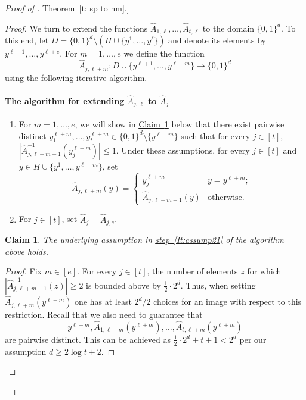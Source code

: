 \documentclass[11pt]{article}
\numberwithin{equation}{section}
\newtheorem{claim}[theorem]{Claim}
\theoremstyle{definition}
\theoremstyle{plain}
\newcommand{\expref}[2]{\hyperref[#2]{#1~\ref{#2}}}
\newcommand{\expeqref}[2]{\hyperref[#2]{#1~\eqref{#2}}}
\newcommand{\adv}{A}
\newcommand{\abs}[1]{\left\lvert #1\right\rvert}
\begin{document}
\begin{proof}[Proof of \expref{Theorem}{t: sp to nm}.]
\begin{proof}
We turn to extend the functions $\widehat{A}_{1,\ell}, \ldots, \widehat{A}_{t,\ell}$ to the domain $\{0,1\}^d$. To this end,
let $D = \{0,1\}^d \setminus (H \cup \{y^1,\ldots,y^\ell\})$ and denote its elements by $y^{\ell+1},\ldots,y^{\ell+e}$. For $m=1,\ldots,e$ we define the function \[
\widehat{\adv}_{j,\ell+m} \colon D \cup \{y^{\ell+1},\ldots, y^{\ell+m}\} \to \{0,1\}^d
\]
using the following iterative algorithm.

%
\paragraph{The algorithm for extending $\widehat{A}_{j,\ell}$ to $\widehat{A}_{j}$}
\begin{enumerate}
%
	\item\label{It:assump21} For $m = 1,\ldots, e$, we will show in \expref{Claim}{c:step 3} below that there exist pairwise distinct $y^{\ell+m}_{1},\ldots,y^{\ell+m}_{t}\in \{0,1\}^d \setminus \{y^{\ell+m}\}$ such that for every $j \in [t]$, $\abs{\widehat{A}_{j,\ell+m-1}^{-1}(y^{\ell+m}_{j})} \le 1$. Under these assumptions, for every $j \in [t]$ and $y \in H \cup \{y^{1},\ldots, y^{\ell+m}\}$, set 
	\[\widehat{A}_{j,\ell+m}(y) = \begin{cases}
	y^{\ell+m}_{j} &  y = y^{\ell+m}; \\
	\widehat{A}_{j,\ell+m-1}(y) & \text{otherwise}.
	\end{cases}\]
	\item\label{It:assump22} For $j \in [t]$, set $\widehat{A}_{j} = \widehat{A}_{j,e}$.
	

	
\end{enumerate}

\begin{claim}\label{c:step 3}
	The underlying assumption in \expeqref{step}{It:assump21} of the algorithm above holds.
\end{claim}

\begin{proof}
	Fix $m \in [e]$. For every $j \in [t]$, the number of elements $z$ for which $|\widehat{A}^{-1}_{j,\ell+m-1}(z)| \ge 2$ is bounded above by $\frac1{2} \cdot 2^d$. Thus, when setting $\widehat{A}_{j,\ell+m}(y^{\ell+m})$ one has at least $2^d/2$ choices for an image with respect to this restriction. Recall that we also need to guarantee that
	\[
	y^{\ell+m}, \widehat{A}_{1,\ell+m}(y^{\ell+m}),\ldots,\widehat{A}_{t,\ell+m}(y^{\ell+m})\]
	are pairwise distinct. This can be achieved as $\frac1{2} \cdot 2^d+t+1 < 2^d$ per our assumption $d \ge 2\log{t}+2$.
\end{proof}


\end{proof}
\end{proof}
\end{document}
